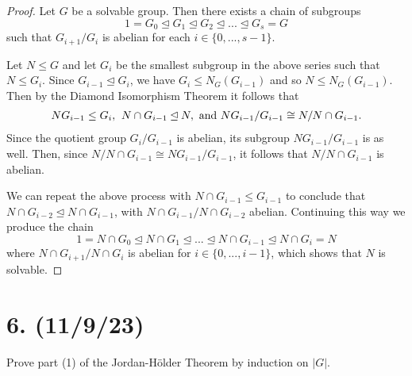 \documentclass{article}
\begin{document}
\begin{proof}
    Let $G$ be a solvable group. Then there exists a chain of subgroups
    \begin{equation*}
        1 = G_0 \unlhd G_1 \unlhd G_2 \unlhd ... \unlhd G_s = G
    \end{equation*}
    such that $G_{i + 1}/G_i$ is abelian for each $i \in \{ 0, ..., s - 1 \}$.

    Let $N \leq G$ and let $G_i$ be the smallest subgroup in the above series such that $N \leq G_i$. Since $G_{i - 1} \unlhd G_i$, we have $G_i \leq N_G(G_{i - 1})$ and so $N \leq N_G(G_{i - 1})$. Then by the Diamond Isomorphism Theorem it follows that
    \begin{align*}
        NG_{i - 1} \leq G_i, \hspace{0.4em}
        N \cap G_{i - 1} \unlhd N, \text{ and }
        NG_{i - 1}/G_{i - 1} \cong N/N \cap G_{i - 1}.
    \end{align*}
    Since the quotient group $G_i/G_{i - 1}$ is abelian, its subgroup $NG_{i - 1}/G_{i - 1}$ is as well. Then, since $N/N \cap G_{i - 1} \cong NG_{i - 1}/G_{i - 1}$, it follows that $N/N \cap G_{i - 1}$ is abelian.

    We can repeat the above process with $N \cap G_{i - 1} \leq G_{i - 1}$ to conclude that $N \cap G_{i - 2} \unlhd N \cap G_{i - 1}$, with $N \cap G_{i - 1}/N \cap G_{i - 2}$ abelian. Continuing this way we produce the chain
    \begin{equation*}
        1 = N \cap G_0 \unlhd N \cap G_1 \unlhd ... \unlhd N \cap G_{i - 1} \unlhd N \cap G_i = N
    \end{equation*}
    where $N \cap G_{i + 1} / N \cap G_i$ is abelian for $i \in \{ 0, ..., i - 1 \}$, which shows that $N$ is solvable.
\end{proof}

\section*{6. (11/9/23)}

Prove part (1) of the Jordan-Hölder Theorem by induction on $|G|$.
\end{document}
